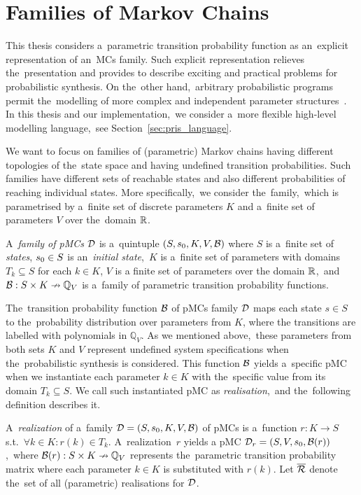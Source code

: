\section{Families of Markov Chains}
This thesis considers a~parametric transition probability function as an~explicit representation of an~MCs family.
Such explicit representation relieves the~presentation and provides to describe exciting and practical problems for probabilistic synthesis.
On the~other hand,~arbitrary probabilistic programs permit the~modelling of more complex and independent parameter structures~\cite{cegar}.
In this thesis and our implementation,~we consider a~more flexible high-level modelling language,~see Section~\ref{sec:pris_language}.

We want to focus on families of (parametric) Markov chains having different topologies of the~state space and having undefined transition probabilities.
Such families have different sets of reachable states and also different probabilities of reaching individual states.
More specifically,~we consider the~family,~which is parametrised by a~finite set of discrete parameters $K$ and a~finite set of parameters $V$ over the~domain $\mathbb{R}$.

\begin{definition}
\cite{cegar}
    A~\emph{family of pMCs} $\mathcal{D}$ is a~quintuple $(S,s_{0},K, V, \mathcal{B})$  where $S$ is a~finite set of \emph{states}, $s_{0} \in S$ is an~\emph{initial state},~$K$ is a~finite set of parameters with domains $T_k \subseteq S$ for each $k \in K$, $V$ is a finite set of parameters over the domain $\mathbb{R}$,~and $\mathcal{B} : S \times K \nrightarrow \mathbb{Q}_V$ is a~family of parametric transition probability functions.
\end{definition}

The~transition probability function $\mathcal{B}$ of pMCs family $\mathcal{D}$ maps each state $s \in S$ to the~probability distribution over parameters from $K$, where the transitions are labelled with polynomials in $\mathbb{Q}_V$.
As we mentioned above,~these parameters from both sets $K$ and $V$ represent undefined system specifications when the~probabilistic synthesis is considered.
This function $\mathcal{B}$ yields a~specific pMC when we instantiate each parameter $k \in K$ with the~specific value from its domain $T_k \subseteq S$.
We call such instantiated pMC as \textit{realisation},~and the~following definition describes it.

\begin{definition}[Realisation]
\cite{cegar}
A~\emph{realization} of a~family $\mathcal{D} = (S,s_{0},K, V, \mathcal{B})$ of pMCs is a~function $r: K \rightarrow S$ s.t.~$\forall k \in K :  r(k) \in T_k$. 
A~realization~$r$ yields a pMC $\mathcal{D}_r = (S, V, s_{0},\mathcal{B}(r))$,~where $\mathcal{B}(r): S \times K \nrightarrow \mathbb{Q}_V$ represents the~parametric transition probability matrix where each parameter $k \in K$ is substituted with $r(k)$. 
Let $\overline{\mathcal{R}}$ denote the~set of all (parametric) realisations for $\mathcal{D}$.
\end{definition}

